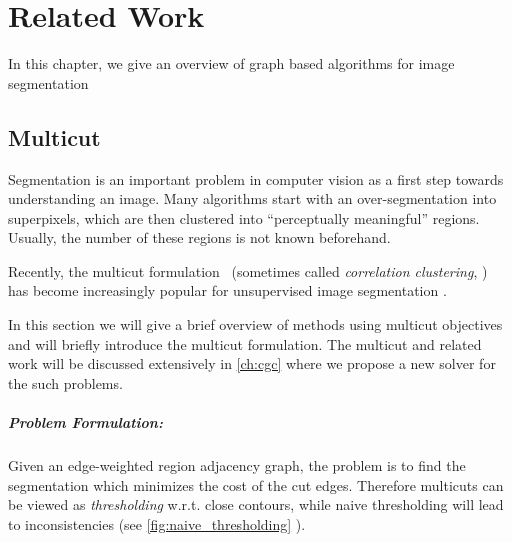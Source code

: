 \chapter{Related Work} \label{ch:reated_work}




























In this chapter, we give an overview of graph based algorithms
for image segmentation 

\section{Multicut}\label{sec:rw_multicut}

Segmentation is an important problem in computer vision as a first step
towards understanding an image. Many algorithms start with an over-segmentation
into superpixels, which are then clustered into ``perceptually meaningful''
regions.
Usually, the number of these regions is not known beforehand.

Recently, the multicut formulation~\cite{chopra_1993_mp}
(sometimes called \emph{correlation clustering}, \cite{bansal_2004_ml})
has become increasingly popular for unsupervised
image segmentation \cite{andres_2011_iccv,yarkony_2012_eccv,alush_2013_simbad}.

In this section we will give a brief overview of methods using multicut objectives
and will briefly introduce the multicut formulation.
The multicut and related work will be discussed extensively in \cref{ch:cgc} where
we propose a new solver for the such problems.

\paragraph{Problem Formulation:}
Given an edge-weighted region adjacency graph,
the problem is to find the segmentation which
minimizes the cost of the cut edges.
Therefore multicuts can be viewed as \emph{thresholding} w.r.t. close contours, while
naive thresholding will lead to inconsistencies 
(see \cref{fig:naive_thresholding} ).

